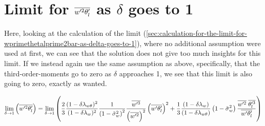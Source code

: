 \section{Limit for \texorpdfstring{$\overline{w'^2 \theta_l'}$}{wprimethetaltwobar} as \texorpdfstring{$\delta$}{delta} goes to 1}
\label{sec:limit-for-wprimethetal2bar-as-delta-goes-to-1}

Here, looking at the calculation of the limit
(\cref{sec:calculation-for-the-limit-for-wprimethetalprime2bar-as-delta-goes-to-1}),
where no additional assumption were used at first,
we can see that the solution does not give too much insights for this limit.
If we instead again use the same assumption as above,
specifically, that the third-order-moments go to zero as $\delta$ approaches 1,
we see that this limit is also going to zero, exactly as wanted.

\begin{align}
    \label{eq:limit_wprimethetalprime2bar_delta_to_1}
    \lim_{\delta \to 1}\left(\overline{w'^2 \theta_l'}\right)
    = \lim_{\delta \to 1}
    \left(
    \frac{2}{3}
    \frac{(1-\delta \lambda_{w \theta})^2}{(1-\delta \lambda_w)^2}
    \frac{1}{\left( 1 - \tilde{\sigma}_w^2 \right)^2}
    \frac{\overline{w'^3}}{\left(\overline{w'^2} \right)^2}
    \left(\overline{w' \theta_l'} \right)^2
    +
    \frac{1}{3}
    \frac{(1-\delta \lambda_w)}{(1-\delta \lambda_{w \theta})}
    \left( 1 - \tilde{\sigma}_w^2 \right)
    \frac{\overline{w'^2} \; \overline{\theta_l'^3}}{\overline{w' \theta_l'}}
    \right)
\end{align}